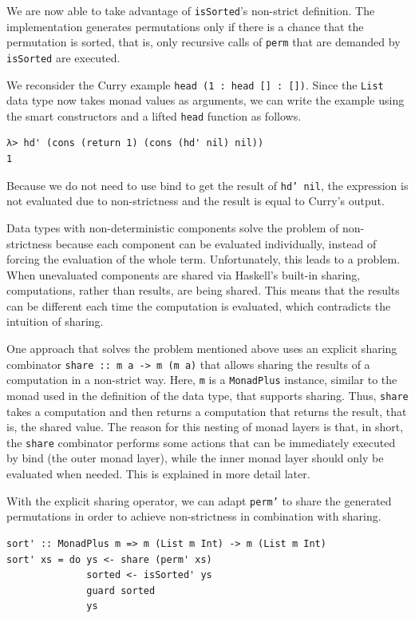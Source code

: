 \documentclass[a4paper, 11pt, fleqn, twoside]{scrreprt}
\newcommand{\hinl}[1]{\texttt{#1}}
\begin{document}
We are now able to take advantage of \hinl{isSorted}'s non-strict definition.
The implementation generates permutations only if there is a chance that the permutation is sorted, that is, only recursive calls of \hinl{perm} that are demanded by \hinl{isSorted} are executed.

We reconsider the Curry example \hinl{head (1 : head [] : [])}.
Since the \hinl{List} data type now takes monad values as arguments, we can write the example using the smart constructors and a lifted \hinl{head} function as follows.

\begin{verbatim}
λ> hd' (cons (return 1) (cons (hd' nil) nil))
1
\end{verbatim}

Because we do not need to use bind to get the result of \hinl{hd' nil}, the expression is not evaluated due to non-strictness and the result is equal to Curry's output.

Data types with non-deterministic components solve the problem of non-strictness because each component can be evaluated individually, instead of forcing the evaluation of the whole term.
Unfortunately, this leads to a problem.
\label{sec:sharingComputations}
When unevaluated components are shared via Haskell's built-in sharing, computations, rather than results, are being shared.
This means that the results can be different each time the computation is evaluated, which contradicts the intuition of sharing.

One approach that solves the problem mentioned above uses an explicit sharing combinator \hinl{share :: m a -> m (m a)} that allows sharing the results of a computation in a non-strict way.
Here, \hinl{m} is a \hinl{MonadPlus} instance, similar to the monad used in the definition of the data type, that supports sharing.
Thus, \hinl{share} takes a  computation and then returns a computation that returns the result, that is, the shared value.
The reason for this nesting of monad layers is that, in short, the \hinl{share} combinator performs some actions that can be immediately executed by bind (the outer monad layer), while the inner monad layer should only be evaluated when needed.
This is explained in more detail later.

With the explicit sharing operator, we can adapt \hinl{perm'} to share the generated permutations in order to achieve non-strictness in combination with sharing.

\begin{verbatim}
sort' :: MonadPlus m => m (List m Int) -> m (List m Int)
sort' xs = do ys <- share (perm' xs)
              sorted <- isSorted' ys
              guard sorted
              ys
\end{verbatim}
\end{document}
